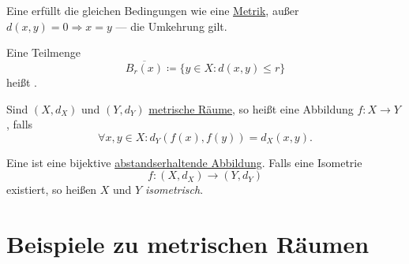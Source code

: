 \begin{definition}[Pseudometrik]\label{def:pseudometrik}
  Eine  erfüllt die gleichen Bedingungen wie eine \hyperref[def:metrik]{Metrik}, außer \( d(x,y) = 0 \Rightarrow x = y \) --- die Umkehrung gilt.
\end{definition}


\begin{definition}\label{def:abgeschlossenerBall}
  Eine Teilmenge
  \begin{equation*}
    \overline{B_r(x)} \coloneqq \{ y \in X : d(x,y) \leq r \}
  \end{equation*}
  heißt .
\end{definition}

\begin{definition}\label{def:abstandserhaltendeAbbildung}
  Sind \( (X, d_X) \) und \( (Y, d_Y) \) \hyperref[def:metrischerRaum]{metrische Räume}, so heißt eine Abbildung \( f: X \to Y \) , falls
  \begin{equation*}
    \forall x, y \in X: d_Y(f(x), f(y)) = d_X(x, y)\text{.}
  \end{equation*}
\end{definition}

\begin{definition}[Isometrie]\label{def:isometrie}
  Eine  ist eine bijektive \hyperref[def:abstandserhaltendeAbbildung]{abstandserhaltende Abbildung}. Falls eine Isometrie
  \begin{equation*}
    f: (X, d_X) \to (Y, d_Y)
  \end{equation*}
  existiert, so heißen \( X \) und \( Y \) \emph{isometrisch}.
\end{definition}

\section{Beispiele zu metrischen Räumen}

